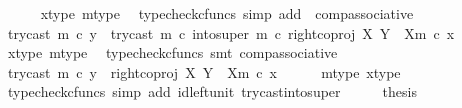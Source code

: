 \begin{isabellebody}
\ \ \ \ \isamarkupfalse%
\ x{\isacharunderscore}{\kern0pt}type\ m{\isacharunderscore}{\kern0pt}type\ \isamarkupfalse%
\ {\isacharparenleft}{\kern0pt}typecheck{\isacharunderscore}{\kern0pt}cfuncs{\isacharcomma}{\kern0pt}\ simp\ add{\isacharcolon}{\kern0pt}\ \ comp{\isacharunderscore}{\kern0pt}associative{}{\isacharparenright}{\kern0pt}\isanewline
\ \ \isamarkupfalse%
\ \isamarkupfalse%
\ {\isachardoublequoteopen}try{\isacharunderscore}{\kern0pt}cast\ m\ {\isasymcirc}\isactrlsub c\ y\ {\isacharequal}{\kern0pt}\ {\isacharparenleft}{\kern0pt}try{\isacharunderscore}{\kern0pt}cast\ m\ {\isasymcirc}\isactrlsub c\ into{\isacharunderscore}{\kern0pt}super\ m{\isacharparenright}{\kern0pt}\ {\isasymcirc}\isactrlsub c\ right{\isacharunderscore}{\kern0pt}coproj\ X\ {\isacharparenleft}{\kern0pt}Y\ {\isasymsetminus}\ {\isacharparenleft}{\kern0pt}X{\isacharcomma}{\kern0pt}m{\isacharparenright}{\kern0pt}{\isacharparenright}{\kern0pt}\ {\isasymcirc}\isactrlsub c\ x{\isachardoublequoteclose}\isanewline
\ \ \ \ \isamarkupfalse%
\ x{\isacharunderscore}{\kern0pt}type\ m{\isacharunderscore}{\kern0pt}type\ \isamarkupfalse%
\ {\isacharparenleft}{\kern0pt}typecheck{\isacharunderscore}{\kern0pt}cfuncs{\isacharcomma}{\kern0pt}\ smt\ comp{\isacharunderscore}{\kern0pt}associative{}{\isacharparenright}{\kern0pt}\isanewline
\ \ \isamarkupfalse%
\ \isamarkupfalse%
\ {\isachardoublequoteopen}try{\isacharunderscore}{\kern0pt}cast\ m\ {\isasymcirc}\isactrlsub c\ y\ {\isacharequal}{\kern0pt}\ right{\isacharunderscore}{\kern0pt}coproj\ X\ {\isacharparenleft}{\kern0pt}Y\ {\isasymsetminus}\ {\isacharparenleft}{\kern0pt}X{\isacharcomma}{\kern0pt}m{\isacharparenright}{\kern0pt}{\isacharparenright}{\kern0pt}\ {\isasymcirc}\isactrlsub c\ x{\isachardoublequoteclose}\isanewline
\ \ \ \ \isamarkupfalse%
\ m{\isacharunderscore}{\kern0pt}type\ x{\isacharunderscore}{\kern0pt}type\ \isamarkupfalse%
\ {\isacharparenleft}{\kern0pt}typecheck{\isacharunderscore}{\kern0pt}cfuncs{\isacharcomma}{\kern0pt}\ simp\ add{\isacharcolon}{\kern0pt}\ id{\isacharunderscore}{\kern0pt}left{\isacharunderscore}{\kern0pt}unit{}\ try{\isacharunderscore}{\kern0pt}cast{\isacharunderscore}{\kern0pt}into{\isacharunderscore}{\kern0pt}super{\isacharparenright}{\kern0pt}\isanewline
\ \ \isamarkupfalse%
\ \isamarkupfalse%
\ {\isacharquery}{\kern0pt}thesis\isanewline
\ \ \ \ \isamarkupfalse%

\end{isabellebody}
